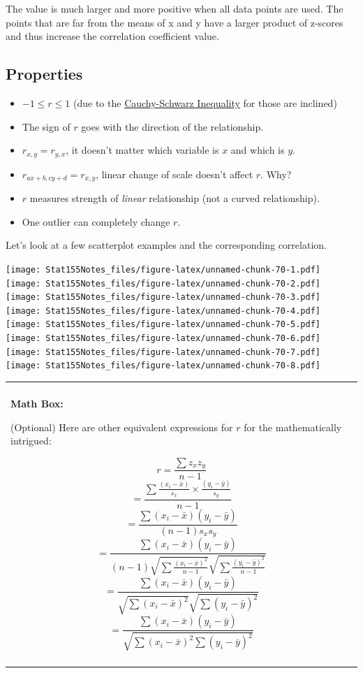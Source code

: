 \documentclass[]{book}
\newenvironment{mathbox}
{
    \begin{center}
    
    \begin{tabular}{|p{0.8\textwidth}|}
    \rowcolor{LightYellow}
    \hline\\
    \rowcolor{LightYellow}
    \textbf{Math Box:}
}
{
    \\\rowcolor{LightYellow}
    \\\hline
    \end{tabular} 
    \end{center}
}
\begin{document}
The value is much larger and more positive when all data points are used. The points that are far from the means of x and y have a larger product of z-scores and thus increase the correlation coefficient value.

\hypertarget{properties}{%
\subsection{Properties}\label{properties}}

\begin{itemize}
\item
  \(-1 \leq r \leq 1\) (due to the \href{https://en.wikipedia.org/wiki/Cauchy\%E2\%80\%93Schwarz_inequality}{Cauchy-Schwarz Inequality} for those are inclined)
\item
  The sign of \(r\) goes with the direction of the relationship.
\item
  \(r_{x,y} = r_{y,x}\), it doesn't matter which variable is \(x\) and which is \(y\).
\item
  \(r_{ax+b, cy+d} = r_{x,y}\), linear change of scale doesn't affect \(r\). Why?
\item
  \(r\) measures strength of \emph{linear} relationship (not a curved relationship).
\item
  One outlier can completely change \(r\).
\end{itemize}

Let's look at a few scatterplot examples and the corresponding correlation.

\texttt{[image: Stat155Notes\_files/figure-latex/unnamed-chunk-70-1.pdf]} \texttt{[image: Stat155Notes\_files/figure-latex/unnamed-chunk-70-2.pdf]} \texttt{[image: Stat155Notes\_files/figure-latex/unnamed-chunk-70-3.pdf]} \texttt{[image: Stat155Notes\_files/figure-latex/unnamed-chunk-70-4.pdf]} \texttt{[image: Stat155Notes\_files/figure-latex/unnamed-chunk-70-5.pdf]} \texttt{[image: Stat155Notes\_files/figure-latex/unnamed-chunk-70-6.pdf]} \texttt{[image: Stat155Notes\_files/figure-latex/unnamed-chunk-70-7.pdf]} \texttt{[image: Stat155Notes\_files/figure-latex/unnamed-chunk-70-8.pdf]}

\begin{mathbox}
(Optional) Here are other equivalent expressions for \(r\) for the
mathematically intrigued:

\[ r = \frac{\sum z_x z_y}{n-1}  \]
\[ = \frac{\sum{\frac{(x_i-\bar{x})}{s_x}\times\frac{(y_i-\bar{y})}{s_y}}}{n-1}\]
\[= \frac{\sum{(x_i-\bar{x})(y_i-\bar{y})}}{(n-1) s_x s_y}\]
\[= \frac{\sum{(x_i-\bar{x})(y_i-\bar{y})}}{{(n-1)\sqrt{\sum{\frac{(x_i-\bar{x})^2}{n-1}}}}{\sqrt{\sum{\frac{(y_i-\bar{y})^2}{n-1}}}}}\]
\[=\frac{\sum{(x_i-\bar{x})(y_i-\bar{y})}}{{\sqrt{\sum{(x_i-\bar{x})^2}}}{\sqrt{\sum{(y_i-\bar{y})^2}}}}\]
\[=\frac{\sum{(x_i-\bar{x})(y_i-\bar{y})}}{{\sqrt{\sum{(x_i-\bar{x})^2\sum{(y_i-\bar{y})^2}}}}}\]
\end{mathbox}
\end{document}
